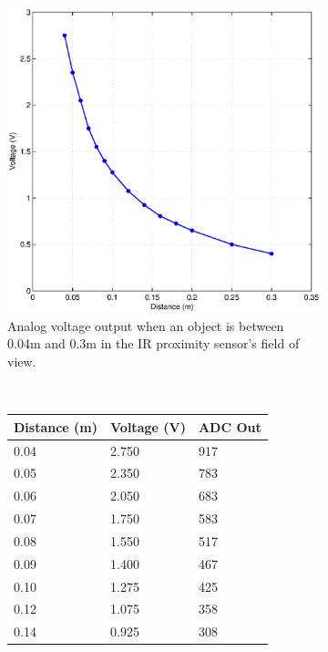 \documentclass[10pt]{article}
\begin{document}
\begin{figure}[t]
  \centering
  \begin{subfigure}{0.45\textwidth}
    \includegraphics[width=\textwidth]{images/ir-sensor-graph.eps}
    \caption{Analog voltage output when an object is between 0.04m and 0.3m in the IR proximity sensor's field of view.}
    \label{fig:ir-volts-meters}
  \end{subfigure}
  $\qquad$
  \begin{subfigure}{0.45\textwidth}
    \begin{center}
    \begin{tabular}{|p{}|p{}|p{}|}
       \hline
       Distance (m) & Voltage (V) & ADC Out\\
       \hline
       0.04 & 2.750 & 917 \\
       0.05 & 2.350 & 783 \\
       0.06 & 2.050 & 683 \\
       0.07 & 1.750 & 583 \\
       0.08 & 1.550 & 517 \\
       0.09 & 1.400 & 467 \\
       0.10 & 1.275 & 425 \\
       0.12 & 1.075 & 358 \\
       0.14 & 0.925 & 308 \\

\end{tabular}
\end{center}
\end{subfigure}
\end{figure}
\end{document}
